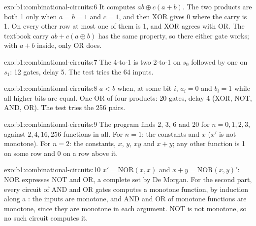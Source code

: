 \begin{solution}{exo:b1:combinational-circuits:6}
It computes $ab \oplus c(a + b)$. The two products are both 1 only when $a = b = 1$ and $c = 1$, and then XOR gives 0
where the carry is 1. On every other row at most one of them is 1, and XOR agrees with OR. The textbook carry $ab + c(a
\oplus b)$ has the same property, so there either gate works; with $a + b$ inside, only OR does.
\end{solution}

\begin{solution}{exo:b1:combinational-circuits:7}
The 4-to-1  is two 2-to-1  on $s_0$ followed by one on $s_1$: 12 gates, delay 5. The test tries
the 64 inputs.
\end{solution}

\begin{solution}{exo:b1:combinational-circuits:8}
$a < b$ when, at some bit $i$, $a_i = 0$ and $b_i = 1$ while all higher bits are equal. One OR of four products: 20 gates,
delay 4 (XOR, NOT, AND, OR). The test tries the 256 pairs.
\end{solution}

\begin{solution}{exo:b1:combinational-circuits:9}
The program finds 2, 3, 6 and 20 for $n = 0, 1, 2, 3$, against $2, 4, 16, 256$ functions in all. For $n = 1$: the
constants and $x$ ($x'$ is not monotone). For $n = 2$: the constants, $x$, $y$, $xy$ and $x + y$; any other function is
1 on some row and 0 on a row above it.
\end{solution}

\begin{solution}{exo:b1:combinational-circuits:10}
$x' = \text{NOR}(x, x)$ and $x + y = \text{NOR}(x, y)'$: NOR expresses NOT and OR, a complete set by De Morgan. For the
second part, every circuit of AND and OR gates computes a monotone function, by induction along a :
the inputs are monotone, and AND and OR of monotone functions are monotone, since they are monotone in each argument.
NOT is not monotone, so no such circuit computes it.
\end{solution}

